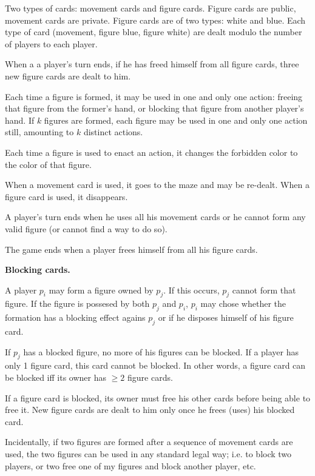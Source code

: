 \documentclass[a4paper, 12pt]{article}
\begin{document}
Two types of cards: movement cards and figure cards. Figure cards are public,
movement cards are private. Figure cards are of two types: white and blue. Each
type of card (movement, figure blue, figure white) are dealt modulo the number
of players to each player.

When a a player's turn ends, if he has freed himself from all figure cards, three new figure cards are 
dealt to him.

Each time a figure is formed, it may be used in one and only one action:
freeing that figure from the former's hand, or blocking that figure from
another player's hand. If $k$ figures are formed, each figure may be used in
one and only one action still, amounting to $k$ distinct actions.

Each time a figure is used to enact an action, it changes the forbidden color 
to the color of that figure.

When a movement card is used, it goes to the maze and may be re-dealt. When a
figure card is used, it disappears.

A player's turn ends when he uses all his movement cards or he cannot form any
valid figure (or cannot find a way to do so).

The game ends when a player frees himself from all his figure cards.

\textbf{Blocking cards.} 

A player $p_i$ may form a figure owned by $p_j$. If this occurs, $p_j$ cannot
form that figure. If the figure is possesed by both $p_j$ and $p_i$, $p_i$ may
chose whether the formation has a blocking effect agains $p_j$ or if he
disposes himself of his figure card.

If $p_j$ has a blocked figure, no more of his figures can be blocked. If a
player has only 1 figure card, this card cannot be blocked. In other words, 
a figure card can be blocked iff its owner has $\geq 2$ figure cards.

If a figure card is blocked, its owner must free his other cards before being 
able to free it. New figure cards are dealt to him only once he frees (uses)
his blocked card.

Incidentally, if two figures are formed after a sequence of movement cards are used, 
the two figures can be used in any standard legal way; i.e. to block two players, or 
two free one of my figures and block another player, etc.
\end{document}
